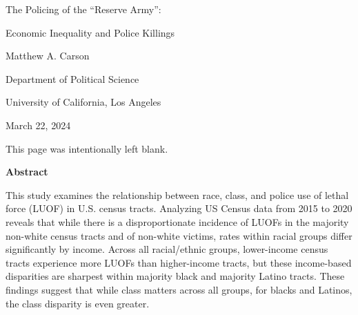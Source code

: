 \documentclass[12pt]{article}
\renewcommand{\headrulewidth}{1pt} %
\renewenvironment{abstract}
  {\par\noindent\centering\textbf{Abstract}\par}
  {\noindent\raggedright}
\begin{document}
\begin{titlepage}
  \thispagestyle{fancy}
  \renewcommand{\headrulewidth}{0pt} %
  \centering
  \vspace*{2in}
  The Policing of the ``Reserve Army'':\par
  Economic Inequality and Police Killings\par
  \vspace{1.2in}
  {Matthew A. Carson\par}
  \vspace{12pt}
  Department of Political Science\par
  University of California, Los Angeles\par
  \vspace{0.5in}
  {March 22, 2024\par}
\end{titlepage}

\thispagestyle{empty} %

\vspace*{\fill}
\hspace*{\fill}
\begin{center}
    \noindent{}This page was intentionally left blank.
\end{center}
\hspace*{\fill}
\vspace*{\fill}

\clearpage

\begin{abstract}
This study examines the relationship between race, class, and police use of lethal force (LUOF) in U.S. census tracts. Analyzing US Census data from 2015 to 2020 reveals that while there is a disproportionate incidence of LUOFs in the majority non-white census tracts and of non-white victims, rates within racial groups differ significantly by income. Across all racial/ethnic groups, lower-income census tracts experience more LUOFs than higher-income tracts, but these income-based disparities are sharpest within majority black and majority Latino tracts. These findings suggest that while class matters across all groups, for blacks and Latinos, the class disparity is even greater.
\end{abstract}
\end{document}
